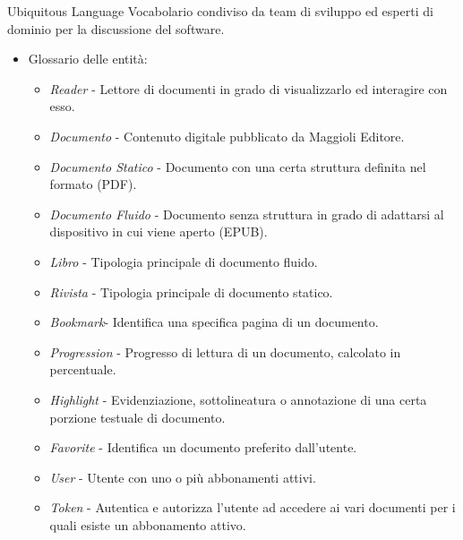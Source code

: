     \begin{frame}{Ubiquitous Language}
        Vocabolario condiviso da team di sviluppo ed esperti di dominio per la discussione del software.
        \begin{itemize}
            \item Glossario delle entità:
            \begin{itemize}
            \item \textit{Reader} - Lettore di documenti in grado di visualizzarlo ed interagire con esso.
            \item \textit{Documento} - Contenuto digitale pubblicato da Maggioli Editore.
            \item \textit{Documento Statico} - Documento con una certa struttura definita nel formato (PDF).
            \item \textit{Documento Fluido} - Documento senza struttura in grado di adattarsi al dispositivo in cui viene aperto (EPUB).
            \item \textit{Libro} - Tipologia principale di documento fluido.
            \item \textit{Rivista} - Tipologia principale di documento statico.
            \item \textit{Bookmark}- Identifica una specifica pagina di un documento.
            \item \textit{Progression} - Progresso di lettura di un documento, calcolato in percentuale.
            \item \textit{Highlight} - Evidenziazione, sottolineatura o annotazione di una certa porzione testuale di documento.
            \item \textit{Favorite} - Identifica un documento preferito dall'utente.
            \item \textit{User} - Utente con uno o più abbonamenti attivi.
            \item \textit{Token} - Autentica e autorizza l'utente ad accedere ai vari documenti per i quali esiste un abbonamento attivo.
            \end{itemize}
        \end{itemize}
    \end{frame}

